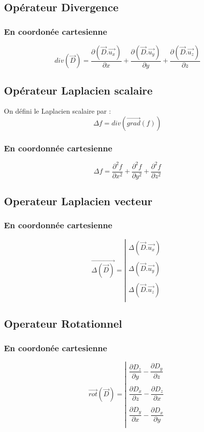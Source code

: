 \subsection{Opérateur Divergence}
\subsubsection{En coordonée cartesienne}
$$div(\overrightarrow{D}) = \dfrac{\partial (\overrightarrow{D}.\overrightarrow{u_x})}{\partial x} + \dfrac{\partial (\overrightarrow{D}.\overrightarrow{u_y})}{\partial y} + \dfrac{\partial (\overrightarrow{D}.\overrightarrow{u_z})}{\partial z}$$
\subsection{Opérateur Laplacien scalaire}
\begin{de}
On défini le Laplacien scalaire par : 
$$\Delta f = div(\overrightarrow{grad}(f))$$
\end{de}
\subsubsection{En coordonnée cartesienne}
$$\Delta f = \dfrac{\partial^2 f}{\partial x^2} + \dfrac{\partial^2 f}{\partial y^2} + \dfrac{\partial^2 f}{\partial z^2}$$
\subsection{Operateur Laplacien vecteur}
\subsubsection{En coordonnée cartesienne}
\[ \overrightarrow{\Delta(\overrightarrow{D})} = \left|
 \begin{array}{*{4}{c}}
\Delta(\overrightarrow{D}.\overrightarrow{u_x})\\
 			      \\
\Delta(\overrightarrow{D}.\overrightarrow{u_y})\\
			      \\
\Delta(\overrightarrow{D}.\overrightarrow{u_z})\\
\end{array} \right. \]
\subsection{Operateur Rotationnel}
\subsubsection{En coordonée cartesienne}
\[ \overrightarrow{rot}(\overrightarrow{D}) = \left|
 \begin{array}{*{4}{c}}
\dfrac{\partial D_z}{\partial y} - \dfrac{\partial D_y}{\partial z}\\
 			      \\
\dfrac{\partial D_x}{\partial z} - \dfrac{\partial D_z}{\partial x}\\
			      \\
\dfrac{\partial D_y}{\partial x} - \dfrac{\partial D_x}{\partial y}\\
\end{array} \right. \]
